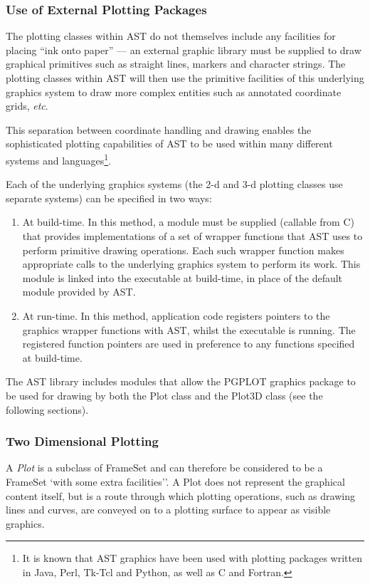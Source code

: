 \documentclass[final,authoryear,5p,times,twocolumn]{elsarticle}
\begin{document}
\subsubsection{Use of External Plotting Packages}
The plotting classes within AST do not themselves include any facilities
for placing ``ink onto paper'' --- an external graphic library must be
supplied to draw graphical primitives such as straight lines, markers and
character strings. The plotting classes within AST will then use the
primitive facilities of this underlying graphics system to draw more complex
entities such as annotated coordinate grids, \emph{etc}.

This separation between coordinate handling and drawing enables the
sophisticated plotting capabilities of AST to be used within many
different systems and languages\footnote{It is known that AST graphics
have been used with plotting packages written in Java, Perl, Tk-Tcl and
Python, as well as C and Fortran.}.

Each of the underlying graphics systems (the 2-d and 3-d plotting classes use
separate systems) can be specified in two ways:

\begin{enumerate}
\item At build-time. In this method, a module must be supplied (callable from
C) that provides implementations of a set of wrapper functions that AST
uses to perform primitive drawing operations. Each such wrapper function
makes appropriate calls to the underlying graphics system to perform its
work. This module is linked into the executable at build-time, in place
of the default module provided by AST.
\item At run-time. In this method, application code registers pointers to
the graphics wrapper functions with AST, whilst the executable is running.
The registered function pointers are used in preference to any functions
specified at build-time.
\end{enumerate}

The AST library includes modules that allow the PGPLOT
graphics package \citep[][]{1991BAAS...23..991P} to
be used for drawing by both the Plot class and the Plot3D class (see the
following sections).

\subsubsection{Two Dimensional Plotting}
A \emph{Plot} is a subclass of FrameSet and can therefore be considered
to be a FrameSet `with some extra facilities''. A Plot does not represent
the graphical content itself, but is a route through which plotting
operations, such as drawing lines and curves, are conveyed on to a
plotting surface to appear as visible graphics.
\end{document}
